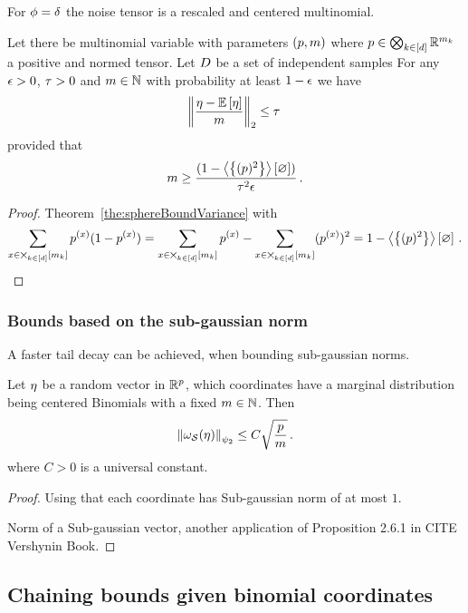 For $\phi=\delta$ the noise tensor is a rescaled and centered multinomial.

\begin{corollary}
	Let there be multinomial variable with parameters $(p,m)$ where $p\in\bigotimes_{k\in[d]} \mathbb{R}^{m_{k}}$ a positive and normed tensor.
	Let $D$ be a set of independent samples
	For any $\epsilon>0$, $\tau>0$ and $m\in\mathbb{N}$ with probability at least $1-\epsilon$ we have
		\[ \left\|\frac{\eta-\mathbb{E}\left[\eta\right]}{m}\right\|_{2} \leq   \tau \, \]
	provided that
		\[ m \geq  \frac{(1-\left\langle \left\{(p)^2\right\}\right\rangle \left[ \varnothing \right])}{\tau^2 \epsilon} \, . \]
\end{corollary}
\begin{proof}
	Theorem~\ref{the:sphereBoundVariance} with 
		\[ \sum_{x\in\bigtimes_{k\in[d]}[m_{k}]} p^{(x)}(1-p^{(x)}) = \sum_{x\in\bigtimes_{k\in[d]}[m_{k}]} p^{(x)} - \sum_{x\in\bigtimes_{k\in[d]}[m_{k}]} (p^{(x)})^2 = 1-\left\langle \left\{(p)^2\right\}\right\rangle \left[ \varnothing \right] \, . \]
\end{proof}



\subsubsection{Bounds based on the sub-gaussian norm}


A faster tail decay can be achieved, when bounding sub-gaussian norms.


\begin{theorem}
	Let $\eta$ be a random vector in $\mathbb{R}^p$, which coordinates have a marginal distribution being centered Binomials with a fixed $m\in\mathbb{N}$.
	Then
		\[ \left\|\omega_{\mathcal{S}}(\eta)\right\|_{\psi_2} \leq C \sqrt{\frac{p}{m}} \, . \]
	where $C>0$ is a universal constant.
\end{theorem}
\begin{proof}
	Using that each coordinate has Sub-gaussian norm of at most $1$.

	
	Norm of a Sub-gaussian vector, another application of Proposition 2.6.1 in CITE Vershynin Book.
\end{proof}




\subsection{Chaining bounds given binomial coordinates}

